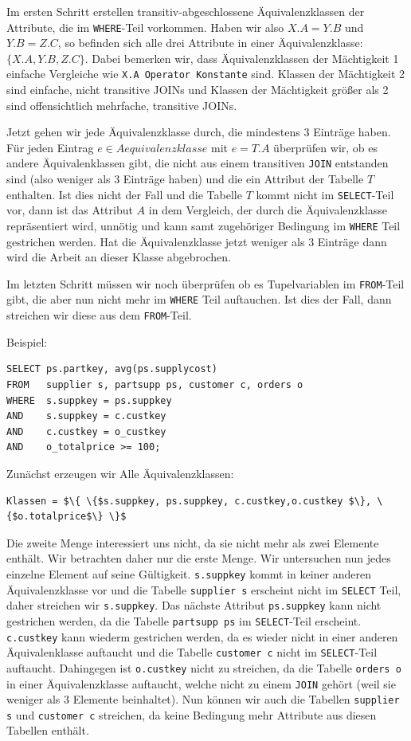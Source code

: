 Im ersten Schritt erstellen transitiv-abgeschlossene Äquivalenzklassen der Attribute, die im \verb|WHERE|-Teil vorkommen. Haben wir also $X.A=Y.B$ und $Y.B=Z.C$, so befinden sich alle drei Attribute in einer Äquivalenzklasse: $\{X.A,Y.B,Z.C\}$. Dabei bemerken wir, dass Äquivalenzklassen der Mächtigkeit 1 einfache Vergleiche wie \verb|X.A Operator Konstante| sind. Klassen der Mächtigkeit 2 sind einfache, nicht transitive JOINs und Klassen der Mächtigkeit größer als 2 sind offensichtlich mehrfache, transitive JOINs.

Jetzt gehen wir jede Äquivalenzklasse durch, die mindestens 3 Einträge haben. Für jeden Eintrag $e\in\mathit{Aequivalenzklasse}$ mit $e=T.A$ überprüfen wir, ob es andere Äquivalenklassen gibt, die nicht aus einem transitiven \verb|JOIN| entstanden sind (also weniger als 3 Einträge haben) und die ein Attribut der Tabelle $T$ enthalten. Ist dies nicht der Fall und die Tabelle $T$ kommt nicht im \verb|SELECT|-Teil vor, dann ist das Attribut $A$ in dem Vergleich, der durch die Äquivalenzklasse repräsentiert wird, unnötig und kann samt zugehöriger Bedingung im \verb|WHERE| Teil gestrichen werden. Hat die Äquivalenzklasse jetzt weniger als 3 Einträge dann wird die Arbeit an dieser Klasse abgebrochen.

Im letzten Schritt müssen wir noch überprüfen ob es Tupelvariablen im \verb|FROM|-Teil gibt, die aber nun nicht mehr im \verb|WHERE| Teil auftauchen. Ist dies der Fall, dann streichen wir diese aus dem \verb|FROM|-Teil.

Beispiel:
\begin{lstlisting}[mathescape]
SELECT ps.partkey, avg(ps.supplycost)
FROM   supplier s, partsupp ps, customer c, orders o
WHERE  s.suppkey = ps.suppkey 
AND    s.suppkey = c.custkey
AND    c.custkey = o_custkey
AND    o_totalprice >= 100;
\end{lstlisting}

Zunächst erzeugen wir Alle Äquivalenzklassen:
\begin{lstlisting}[mathescape]
Klassen = $\{ \{$s.suppkey, ps.suppkey, c.custkey,o.custkey $\}, \{$o.totalprice$\} \}$
\end{lstlisting}

Die zweite Menge interessiert uns nicht, da sie nicht mehr als zwei Elemente enthält. Wir betrachten daher nur die erste Menge. Wir untersuchen nun jedes einzelne Element auf seine Gültigkeit. \verb|s.suppkey| kommt in keiner anderen Äquivalenzklasse vor und die Tabelle \verb|supplier s| erscheint nicht im \verb|SELECT| Teil, daher streichen wir \verb|s.suppkey|. Das nächste Attribut \verb|ps.suppkey| kann nicht gestrichen werden, da die Tabelle \verb|partsupp ps| im \verb|SELECT|-Teil erscheint. \verb|c.custkey| kann wiederm gestrichen werden, da es wieder nicht in einer anderen Äquivalenklasse auftaucht und die Tabelle \verb|customer c| nicht im \verb|SELECT|-Teil auftaucht. Dahingegen ist \verb|o.custkey| nicht zu streichen, da die Tabelle \verb|orders o| in einer Äquivalenzklasse auftaucht, welche nicht zu einem \verb|JOIN| gehört (weil sie weniger als 3 Elemente beinhaltet). Nun können wir auch die Tabellen \verb|supplier s| und \verb|customer c| streichen, da keine Bedingung mehr Attribute aus diesen Tabellen enthält.

